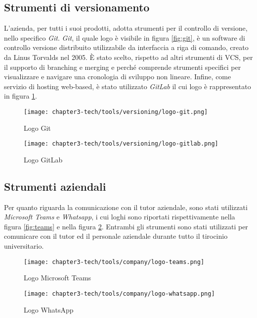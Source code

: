 \subsection{Strumenti di versionamento} \label{subsec: versionamento}

L’azienda, per tutti i suoi prodotti, adotta strumenti per il controllo di versione, nello specifico \emph{Git}. \emph{Git}, il quale logo è visibile in figura \ref{fig:git}, è un software di controllo versione distribuito utilizzabile da interfaccia a riga di comando, creato da Linus Torvalds nel 2005. È stato scelto, rispetto ad altri strumenti di \gls{VCS}, per il supporto di branching e merging e perché comprende strumenti specifici per visualizzare e navigare una cronologia di sviluppo non lineare. Infine, come servizio di hosting web-based, è stato utilizzato \emph{GitLab} il cui logo è rappresentato in figura \ref{fig:gitlab}. 

\begin{figure}[!h]
    \begin{minipage}{.5\textwidth} 
        \centering 
        \texttt{[image: chapter3-tech/tools/versioning/logo-git.png]} 
        \caption{Logo Git} 
        \label{fig:git} 
    \end{minipage}%
    \begin{minipage}{.5\textwidth} 
        \centering 
        \texttt{[image: chapter3-tech/tools/versioning/logo-gitlab.png]} 
        \caption{Logo GitLab} 
        \label{fig:gitlab} 
    \end{minipage}  
\end{figure}

\subsection{Strumenti aziendali} \label{subsec: aziendali}

Per quanto riguarda la comunicazione con il tutor aziendale, sono stati utilizzati \emph{Microsoft Teams} e \emph{Whatsapp}, i cui loghi sono riportati rispettivamente nella figura \ref{fig:teams} e nella figura \ref{fig:whatsapp}. Entrambi gli strumenti sono stati utilizzati per comunicare con il tutor ed il personale aziendale durante tutto il tirocinio universitario.

\begin{figure}[!h]
    \begin{minipage}{.5\textwidth} 
        \centering 
        \texttt{[image: chapter3-tech/tools/company/logo-teams.png]} 
        \caption{Logo Microsoft Teams} 
        \label{fig:teams} 
    \end{minipage}%
    \begin{minipage}{.5\textwidth} 
        \centering 
        \texttt{[image: chapter3-tech/tools/company/logo-whatsapp.png]} 
        \caption{Logo WhatsApp} 
        \label{fig:whatsapp} 
    \end{minipage}  
\end{figure}
\newpage{}
